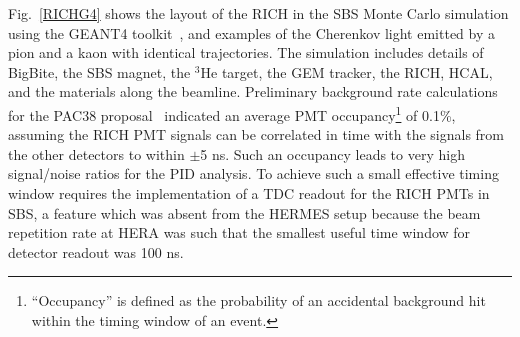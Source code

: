 Fig.~\ref{RICHG4} shows the layout of the RICH in the SBS Monte Carlo simulation using the GEANT4 toolkit~\cite{GEANT42003}, and examples of the Cherenkov light emitted by a pion and a kaon with identical trajectories. The simulation includes details of BigBite, the SBS magnet, the $^3$He target, the GEM tracker, the RICH, HCAL, and the materials along the beamline. Preliminary background rate calculations for the PAC38 proposal~\cite{SBS_SIDIS} indicated an average PMT occupancy\footnote{``Occupancy'' is defined as the probability of an accidental background hit within the timing window of an event.} of 0.1\%, assuming the RICH PMT signals can be correlated in time with the signals from the other detectors to within $\pm$5 ns. Such an occupancy leads to very high signal/noise ratios for the PID analysis. To achieve such a small effective timing window requires the implementation of a TDC readout for the RICH PMTs in SBS, a feature which was absent from the HERMES setup because the beam repetition rate at HERA was such that the smallest useful time window for detector readout was 100 ns.

